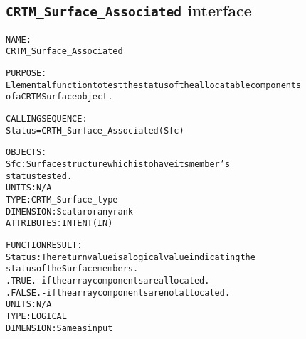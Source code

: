 \subsection{\texttt{CRTM\_Surface\_Associated} interface}
  \label{sec:CRTM_Surface_Associated_interface}
  \begin{alltt}
 
  NAME:
        CRTM_Surface_Associated
 
  PURPOSE:
        Elemental function to test the status of the allocatable components
        of a CRTM Surface object.
 
  CALLING SEQUENCE:
        Status = CRTM_Surface_Associated( Sfc )
 
  OBJECTS:
        Sfc:       Surface structure which is to have its member's
                   status tested.
                   UNITS:      N/A
                   TYPE:       CRTM_Surface_type
                   DIMENSION:  Scalar or any rank
                   ATTRIBUTES: INTENT(IN)
 
  FUNCTION RESULT:
        Status:    The return value is a logical value indicating the
                   status of the Surface members.
                     .TRUE.  - if the array components are allocated.
                     .FALSE. - if the array components are not allocated.
                   UNITS:      N/A
                   TYPE:       LOGICAL
                   DIMENSION:  Same as input
 
  \end{alltt}
